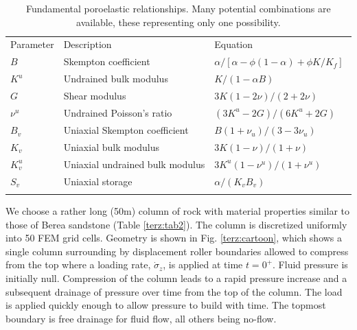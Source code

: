 \begin{table}[!htb]
\begin{center}
\begin{tabular}{lll}
\hline\noalign{\smallskip}
Parameter & Description & Equation \\
\noalign{\smallskip}\hline\noalign{\smallskip}
$B$         & Skempton coefficient & ${\alpha }/{\left[ \alpha -\phi \left( 1-\alpha  \right)+\phi K/{{K}_{f}} \right]}\;$ \\
$K^{u}$     & Undrained bulk modulus & $K/\left( 1-\alpha B \right)$ \\
$G$         & Shear modulus & $3K\left( 1-2\nu  \right)/\left( 2+2\nu  \right)$ \\
$\nu ^{u}$  & Undrained Poisson's ratio &  ${\left( 3{{K}^{u}}-2G \right)}/{\left( 6{{K}^{u}}+2G \right)}\;$ \\
$B_{v}$     & Uniaxial Skempton coefficient &  $B{\left( 1+{{\nu }_{u}} \right)}/{\left( 3-3{{\nu }_{u}} \right)}\;$ \\
$K_{v}$     & Uniaxial bulk modulus & $3K{\left( 1-\nu  \right)}/{\left( 1+\nu  \right)}\;$ \\
$K_{v}^{u}$ & Uniaxial undrained bulk modulus & ${3{{K}^{u}}\left( 1-{{\nu }^{u}} \right)}/{\left( 1+{{\nu }^{u}} \right)}\;$ \\
$S_{v}$     & Uniaxial storage & ${\alpha }/{\left( {{K}_{v}}{{B}_{v}} \right)}\;$ \\
\noalign{\smallskip}\hline
\end{tabular}
\end{center}
\caption{Fundamental poroelastic relationships. Many potential combinations are available, these representing only one possibility.}
\label{terz:tab1}
\end{table}

We choose a rather long (50m) column of rock with material properties similar to those of Berea sandstone (Table \ref{terz:tab2}).  The column is discretized uniformly into 50 FEM grid cells. Geometry is shown in Fig. \ref{terz:cartoon}, which shows a single column surrounding by displacement roller boundaries allowed to compress from the top where a loading rate, ${{\dot{\sigma }}_{z}}$, is applied at time $t=0^{+}$. Fluid pressure is initially null. Compression of the column leads to a rapid pressure increase and a subsequent drainage of pressure over time from the top of the column. The load is applied quickly enough to allow pressure to build with time. The topmost boundary is free drainage for fluid flow, all others being no-flow.

